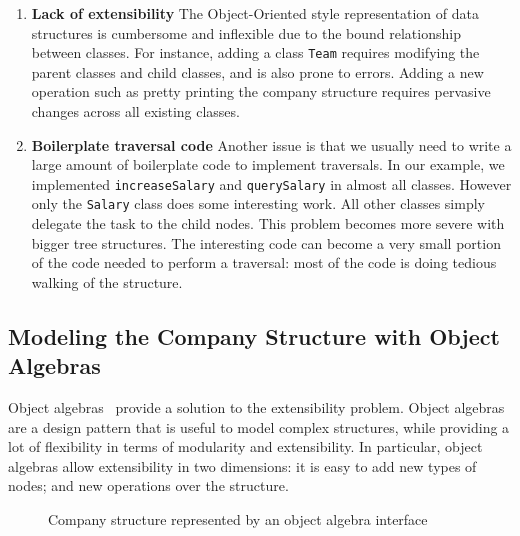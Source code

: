 \begin{enumerate}

\item {\bf Lack of extensibility} The Object-Oriented style
  representation of data structures is cumbersome and
  inflexible due to the bound relationship between classes. For
  instance, adding a class \lstinline{Team} requires modifying the
  parent classes and child classes, and is also prone to errors.
  Adding a new operation such as pretty
  printing the company structure requires pervasive changes across all
  existing classes.

\item {\bf Boilerplate traversal code} Another issue is
  that we usually need to write a large amount of boilerplate code to
  implement traversals. In
  our example, we implemented \lstinline{increaseSalary} and
  \lstinline{querySalary} in almost all classes. However only the
  \lstinline{Salary} class does some interesting work. All other classes
  simply delegate the task to the child nodes. This problem becomes
  more severe with bigger tree structures. The interesting code can
  become a very small portion of the code needed to perform a
  traversal: most of the code is doing tedious
  walking of the structure.

\end{enumerate}

\subsection{Modeling the Company Structure with Object Algebras}

Object algebras~\cite{bruno12oa} provide a solution to the extensibility problem. 
Object algebras are a design pattern that is useful to model complex
structures, while providing a lot of flexibility in terms of
modularity and extensibility. In particular, object algebras allow 
extensibility in two dimensions: it is easy to add new types of
nodes; and new operations over the structure. 

\begin{figure}[tb]
\vspace{-.1in}
\caption{Company structure represented by an object algebra interface}
\label{syb_tree}
\end{figure}

